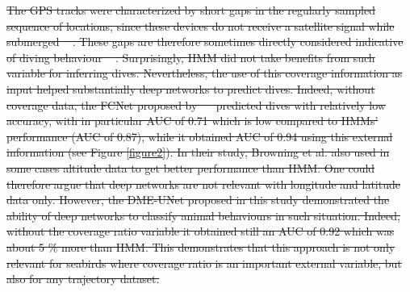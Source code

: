\documentclass{article}
\providecommand{\DIFdeltex}[1]{{\protect\color{red}\sout{#1}}}                      %
\providecommand{\DIFdelbegin}{} %
\providecommand{\DIFdel}[1]{\texorpdfstring{\DIFdeltex{#1}}{}} %
\newcommand{\DIFscaledelfig}{0.5}
\newlength{\DIFdelgraphicswidth} %
\newlength{\DIFdelgraphicsheight} %
\newcommand{\DIFdelincludegraphics}[2][]{%
\sbox{\DIFdelgraphicsbox}{\DIFOincludegraphics[#1]{#2}}%
\settoboxwidth{\DIFdelgraphicswidth}{\DIFdelgraphicsbox} %
\settoboxtotalheight{\DIFdelgraphicsheight}{\DIFdelgraphicsbox} %
\scalebox{\DIFscaledelfig}{%
\parbox[b]{\DIFdelgraphicswidth}{\usebox{\DIFdelgraphicsbox}\\[-\baselineskip] \rule{\DIFdelgraphicswidth}{0em}}\llap{\resizebox{\DIFdelgraphicswidth}{\DIFdelgraphicsheight}{%
\setlength{\unitlength}{\DIFdelgraphicswidth}%
\begin{picture}(1,1)%
\thicklines\linethickness{2pt} %
{\color[rgb]{1,0,0}\put(0,0){\framebox(1,1){}}}%
{\color[rgb]{1,0,0}\put(0,0){\line( 1,1){1}}}%
{\color[rgb]{1,0,0}\put(0,1){\line(1,-1){1}}}%
\end{picture}%
}\hspace*{3pt}}} %
} %
\DeclareRobustCommand{\DIFdelbegin}{\DIFOdelbegin \let\includegraphics\DIFdelincludegraphics} %
\begin{document}
\DIFdelbegin \DIFdel{The GPS tracks were characterized by short gaps in the regularly sampled sequence of locations, since these devices do not receive a satellite signal while submerged \mbox{%
\cite{boyd_movement_2014,wilson_technological_2012}}\hspace{0pt}%
.
These gaps are therefore sometimes directly considered indicative of diving behaviour \mbox{%
\cite{weimerskirch_foraging_2012}}\hspace{0pt}%
.
Surprisingly, HMM did not take benefits from such variable for inferring dives.
Nevertheless, the use of this coverage information as input helped substantially deep networks to predict dives.
Indeed, without coverage data, the FCNet proposed by \mbox{%
\cite{browning_predicting_2018} }\hspace{0pt}%
predicted dives with relatively low accuracy, with in particular AUC of 0.71 which is low  compared to HMMs' performance (AUC of 0.87), while it obtained AUC of 0.94 using this external information (see Figure \ref{figure2}). In their study, Browning et al. also used in some cases altitude data to get better performance than HMM. One could therefore argue that deep networks are not relevant with longitude and latitude data only.
However, the DME-UNet proposed in this study demonstrated the ability of deep networks to classify animal behaviours in such situation. Indeed, without the coverage ratio variable it obtained still an AUC of 0.92 which was about 5 \% more than HMM. This demonstrates that this approach is not only relevant for seabirds where coverage ratio is an important external variable, but also for any trajectory dataset.
}%
\end{document}
